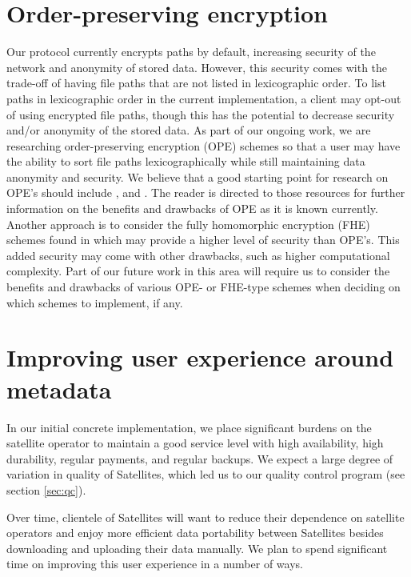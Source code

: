 \documentclass[8pt,fleqn,openany]{book}
\begin{document}
\section{Order-preserving encryption}\label{section:OPE}

Our protocol currently encrypts paths by default,
increasing security of the network and anonymity of stored data.
However, this security comes with the trade-off of having file paths
that are not listed in lexicographic order.
To list paths in lexicographic order in the current implementation,
a client may opt-out of using encrypted file paths,
though this has the potential to decrease security
and/or anonymity of the stored data.
As part of our ongoing work,
we are researching
order-preserving encryption (OPE) schemes
\cite{Agrawal:2004:OPE:1007568.1007632} so that a user may have
the ability to sort file paths lexicographically
while still maintaining data anonymity and security.
We believe that a good starting point for research on OPE's
should include \cite{7815719}, and \cite{10.1007/978-3-642-22792-9_33}.
The reader is directed to those resources for further information
on the benefits and drawbacks of OPE as it is known currently.
Another approach is to consider the fully
homomorphic encryption (FHE) schemes found in \cite{gentry2015fully}
which may provide a higher level of security than OPE's.
This added security may come with other drawbacks,
such as higher computational complexity.
Part of our future work in this area will require us to consider
the benefits and drawbacks of various OPE- or FHE-type schemes
when deciding on which schemes to implement, if any.

\section{Improving user experience around metadata}\label{sec:distributed-metadata}

In our initial concrete implementation, we place significant burdens on the
satellite operator to maintain a good service level with high availability,
high durability, regular payments, and regular backups. We expect a large
degree of variation in quality of Satellites, which led us to our quality
control program (see section \ref{sec:qc}).

Over time, clientele of Satellites will want to reduce their dependence on satellite
operators and enjoy more efficient data portability between Satellites besides
downloading and uploading their data manually. We plan to spend significant time
on improving this user experience in a number of ways.
\end{document}
